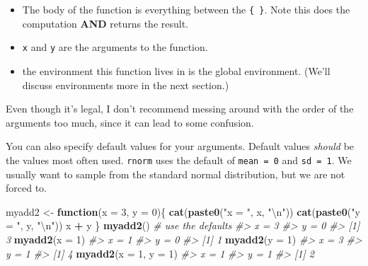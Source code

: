 \documentclass[]{book}
\newenvironment{Shaded}{\begin{snugshade}}{\end{snugshade}}
\newcommand{\KeywordTok}[1]{\textcolor[rgb]{0.13,0.29,0.53}{\textbf{#1}}}
\newcommand{\DataTypeTok}[1]{\textcolor[rgb]{0.13,0.29,0.53}{#1}}
\newcommand{\DecValTok}[1]{\textcolor[rgb]{0.00,0.00,0.81}{#1}}
\newcommand{\CharTok}[1]{\textcolor[rgb]{0.31,0.60,0.02}{#1}}
\newcommand{\StringTok}[1]{\textcolor[rgb]{0.31,0.60,0.02}{#1}}
\newcommand{\CommentTok}[1]{\textcolor[rgb]{0.56,0.35,0.01}{\textit{#1}}}
\newcommand{\ControlFlowTok}[1]{\textcolor[rgb]{0.13,0.29,0.53}{\textbf{#1}}}
\newcommand{\OperatorTok}[1]{\textcolor[rgb]{0.81,0.36,0.00}{\textbf{#1}}}
\newcommand{\NormalTok}[1]{#1}
\providecommand{\tightlist}{%
  \setlength{\itemsep}{0pt}\setlength{\parskip}{0pt}}
\theoremstyle{definition}
\theoremstyle{definition}
\theoremstyle{definition}
\theoremstyle{remark}
\let\BeginKnitrBlock\begin \let\EndKnitrBlock\end
\begin{document}
\begin{itemize}
\tightlist
\item
  The body of the function is everything between the \texttt{\{\ \}}.
  Note this does the computation \textbf{AND} returns the result.
\item
  \texttt{x} and \texttt{y} are the arguments to the function.
\item
  the environment this function lives in is the global environment.
  (We'll discuss environments more in the next section.)
\end{itemize}

\BeginKnitrBlock{rmdtip}
Even though it's legal, I don't recommend messing around with the order
of the arguments too much, since it can lead to some confusion.
\EndKnitrBlock{rmdtip}

You can also specify default values for your arguments. Default values
\emph{should} be the values most often used. \texttt{rnorm} uses the
default of \texttt{mean\ =\ 0} and \texttt{sd\ =\ 1}. We usually want to
sample from the standard normal distribution, but we are not forced to.

\begin{Shaded}
\begin{Highlighting}[]
\NormalTok{myadd2 <-}\StringTok{ }\ControlFlowTok{function}\NormalTok{(}\DataTypeTok{x =} \DecValTok{3}\NormalTok{, }\DataTypeTok{y =} \DecValTok{0}\NormalTok{)\{}
  \KeywordTok{cat}\NormalTok{(}\KeywordTok{paste0}\NormalTok{(}\StringTok{"x = "}\NormalTok{, x, }\StringTok{"}\CharTok{\textbackslash{}n}\StringTok{"}\NormalTok{))}
  \KeywordTok{cat}\NormalTok{(}\KeywordTok{paste0}\NormalTok{(}\StringTok{"y = "}\NormalTok{, y, }\StringTok{"}\CharTok{\textbackslash{}n}\StringTok{"}\NormalTok{))}
\NormalTok{  x }\OperatorTok{+}\StringTok{ }\NormalTok{y}
\NormalTok{\}}
\KeywordTok{myadd2}\NormalTok{()              }\CommentTok{# use the defaults}
\CommentTok{#> x = 3}
\CommentTok{#> y = 0}
\CommentTok{#> [1] 3}
\KeywordTok{myadd2}\NormalTok{(}\DataTypeTok{x =} \DecValTok{1}\NormalTok{)}
\CommentTok{#> x = 1}
\CommentTok{#> y = 0}
\CommentTok{#> [1] 1}
\KeywordTok{myadd2}\NormalTok{(}\DataTypeTok{y =} \DecValTok{1}\NormalTok{)}
\CommentTok{#> x = 3}
\CommentTok{#> y = 1}
\CommentTok{#> [1] 4}
\KeywordTok{myadd2}\NormalTok{(}\DataTypeTok{x =} \DecValTok{1}\NormalTok{, }\DataTypeTok{y =} \DecValTok{1}\NormalTok{)}
\CommentTok{#> x = 1}
\CommentTok{#> y = 1}
\CommentTok{#> [1] 2}
\end{Highlighting}
\end{Shaded}
\end{document}
